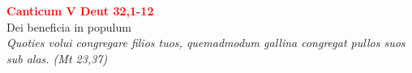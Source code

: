 


\def\greinitialformat#1{%
{\fontsize{39}{39}\selectfont #1}%
}




\vspace{0.3cm}
\begin{center}
 \textcolor{red}{\large \bf Canticum V Deut 32,1-12}\\
Dei beneficia in populum\\
\textit{\small Quoties volui congregare filios tuos, quemadmodum gallina congregat pullos suos sub alas. (Mt 23,37)}
\end{center}
